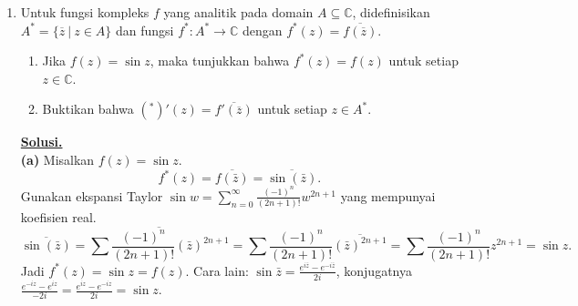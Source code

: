 \documentclass[12pt,twoside]{article}
\newenvironment{solution}
{
	\par\noindent\textbf{\underline{Solusi.}}\\
}
{
	\par
}
\begin{document}
\begin{enumerate}
\begin{solution}
          Jadi untuk setiap $k$, suku yang relevan adalah tepat $\binom{n}{k} \binom{n-k}{\lfloor (n-k)/2 \rfloor} 2^k$, entah dari kasus genap atau ganjil.
          Jumlahkan untuk semua $k=0,\dots,n$:
          \[ \sum_{k=0}^n 2^k \binom{n}{k} \binom{n-k}{\lfloor (n-k)/2 \rfloor} = \binom{2n+1}{n}. \]
          Terbukti.
        \end{solution}
  \item Untuk fungsi kompleks $f$ yang analitik pada domain $A\subseteq \mathbb{C}$, didefinisikan $A^*=\{\overline{z}~|~z\in A\}$ dan fungsi $f^*:A^*\to \mathbb{C}$ dengan $f^*(z)=\overline{f(\overline{z})}$.
        \begin{enumerate}
          \item Jika $f(z)=\sin z$, maka tunjukkan bahwa $f^*(z)=f(z)$ untuk setiap $z\in\mathbb{C}$.
          \item Buktikan bahwa $(^*)'(z)=\overline{f'(\overline{z})}$ untuk setiap $z\in A^*$.
        \end{enumerate}
        \begin{solution}
          \textbf{(a)} Misalkan $f(z) = \sin z$.
          \[ f^*(z) = \overline{f(\bar{z})} = \overline{\sin(\bar{z})}. \]
          Gunakan ekspansi Taylor $\sin w = \sum_{n=0}^\infty \frac{(-1)^n}{(2n+1)!} w^{2n+1}$ yang mempunyai koefisien real.
          \[ \overline{\sin(\bar{z})} = \overline{\sum \frac{(-1)^n}{(2n+1)!} (\bar{z})^{2n+1}} = \sum \frac{(-1)^n}{(2n+1)!} \overline{(\bar{z})^{2n+1}} = \sum \frac{(-1)^n}{(2n+1)!} z^{2n+1} = \sin z. \]
          Jadi $f^*(z) = \sin z = f(z)$. Cara lain: $\sin \bar{z} = \frac{e^{i\bar{z}} - e^{-i\bar{z}}}{2i}$, konjugatnya $\frac{e^{-iz} - e^{iz}}{-2i} = \frac{e^{iz} - e^{-iz}}{2i} = \sin z$.


\end{solution}
\end{enumerate}
\end{document}
